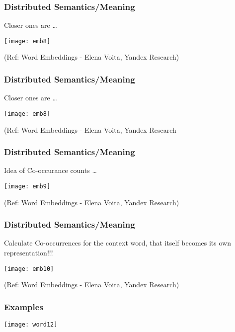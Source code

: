 \begin{frame}[fragile]\frametitle{Distributed Semantics/Meaning}
Closer ones are \ldots

\begin{center}
\texttt{[image: emb8]}
\end{center}

{\tiny (Ref: Word Embeddings - Elena Voita, Yandex Research)}
\end{frame}

\begin{frame}[fragile]\frametitle{Distributed Semantics/Meaning}
Closer ones are \ldots

\begin{center}
\texttt{[image: emb8]}
\end{center}

{\tiny (Ref: Word Embeddings - Elena Voita, Yandex Research}
\end{frame}

\begin{frame}[fragile]\frametitle{Distributed Semantics/Meaning}
Idea of Co-occurance counts \ldots

\begin{center}
\texttt{[image: emb9]}
\end{center}

{\tiny (Ref: Word Embeddings - Elena Voita, Yandex Research)}
\end{frame}

\begin{frame}[fragile]\frametitle{Distributed Semantics/Meaning}
Calculate Co-occurrences for the context word, that itself becomes its own representation!!!

\begin{center}
\texttt{[image: emb10]}
\end{center}

{\tiny (Ref: Word Embeddings - Elena Voita, Yandex Research)}
\end{frame}



\begin{frame}[fragile]\frametitle{Examples}
\begin{center}
\texttt{[image: word12]}
\end{center}
\end{frame}


